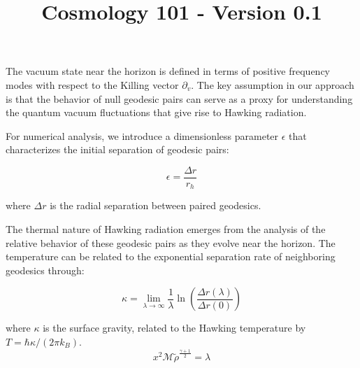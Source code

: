 \documentclass{article}\usepackage{graphicx} \usepackage{amsmath} \usepackage{colortbl}\title{Cosmology 101 - Version 0.1}
\begin{document}
The vacuum state near the horizon is defined in terms of positive frequency modes with respect to the Killing vector $\partial_v$. The key assumption in our approach is that the behavior of null geodesic pairs can serve as a proxy for understanding the quantum vacuum fluctuations that give rise to Hawking radiation.

For numerical analysis, we introduce a dimensionless parameter $\epsilon$ that characterizes the initial separation of geodesic pairs:

\begin{equation}
\epsilon = \frac{\Delta r}{r_h}
\end{equation}

where $\Delta r$ is the radial separation between paired geodesics.

The thermal nature of Hawking radiation emerges from the analysis of the relative behavior of these geodesic pairs as they evolve near the horizon. The temperature can be related to the exponential separation rate of neighboring geodesics through:

\begin{equation}
\kappa = \lim_{\lambda \to \infty} \frac{1}{\lambda} \ln\left(\frac{\Delta r(\lambda)}{\Delta r(0)}\right)
\end{equation}

where $\kappa$ is the surface gravity, related to the Hawking temperature by $T = \hbar\kappa/(2\pi k_B)$. \begin{equation}x^2 \mathcal{M} \tilde{\rho }^{\frac{\gamma +1}{2}}=\lambda \label{Mi ecuacion 8} \end{equation}
\end{document}

